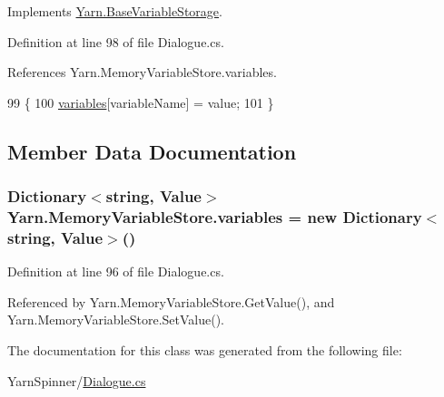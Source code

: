 Implements \hyperlink{a00032_a1c57d6d208b78abec0a670396771448e}{Yarn.\-Base\-Variable\-Storage}.



Definition at line 98 of file Dialogue.\-cs.



References Yarn.\-Memory\-Variable\-Store.\-variables.


\begin{DoxyCode}
99         \{
100             \hyperlink{a00126_aad18acd95297edb8ed496857337f8071}{variables}[variableName] = value;
101         \}
\end{DoxyCode}


\subsection{Member Data Documentation}
\hypertarget{a00126_aad18acd95297edb8ed496857337f8071}{
\subsubsection[{variables}]{\setlength{\rightskip}{0pt plus 5cm}Dictionary$<$string, {\bf Value}$>$ Yarn.\-Memory\-Variable\-Store.\-variables = new Dictionary$<$string, {\bf Value}$>$()\hspace{0.3cm}{\ttfamily [private]}}}\label{a00126_aad18acd95297edb8ed496857337f8071}


Definition at line 96 of file Dialogue.\-cs.



Referenced by Yarn.\-Memory\-Variable\-Store.\-Get\-Value(), and Yarn.\-Memory\-Variable\-Store.\-Set\-Value().



The documentation for this class was generated from the following file\-:\begin{DoxyCompactItemize}
\item 
Yarn\-Spinner/\hyperlink{a00290}{Dialogue.\-cs}\end{DoxyCompactItemize}
